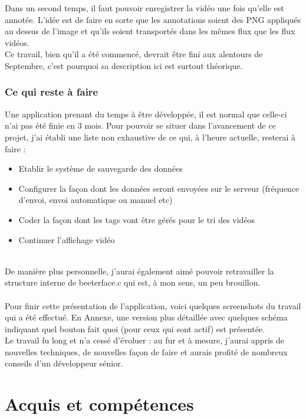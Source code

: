 \documentclass[11pt,french,a4paper]{report}
\begin{document}
Dans un second temps, il faut pouvoir enregistrer la vidéo une fois qu'elle est annotée. L'idée est de faire en sorte que les annotations
soient des PNG appliqués au dessus de l'image et qu'ils soient transportés dans les mêmes flux que les flux vidéos. \\

Ce travail, bien qu'il a été commencé, devrait être fini aux alentours de Septembre, c'est pourquoi sa description ici
est surtout théorique. \\


        \subsection{Ce qui reste à faire}
Une application prenant du temps à être développée, il est normal que celle-ci n'ai pas été finie en 3 mois. Pour pouvoir se situer
dans l'avancement de ce projet, j'ai établi une liste non exhaustive de ce qui, à l'heure actuelle, resterai à faire : \\ 

\begin{itemize}
    \item Etablir le système de sauvegarde des données
    \item Configurer la façon dont les données seront envoyées sur le serveur (fréquence d'envoi, envoi automatique ou manuel etc) 
    \item Coder la façon dont les tags vont être  gérés pour le tri des vidéos 
    \item Continuer l'affichage vidéo
\end{itemize} 
\\
De manière plus personnelle, j'aurai également aimé pouvoir retravailler la structure interne de beeterface.c qui est, à mon sens,
un peu brouillon. \\
\\
Pour finir cette présentation de l'application, voici quelques screenshots du travail qui a été effectué. En Annexe, une version plus
détaillée avec quelques schéma indiquant quel bouton fait quoi (pour ceux qui sont actif) est présentée. \\
Le travail fu long et n'a cessé d'évoluer : au fur et à mesure, j'aurai appris de nouvelles techniques, de nouvelles façon de faire 
et aurais profité de nombreux conseils d'un développeur sénior. \\


\chapter{Acquis et compétences}
\end{document}
